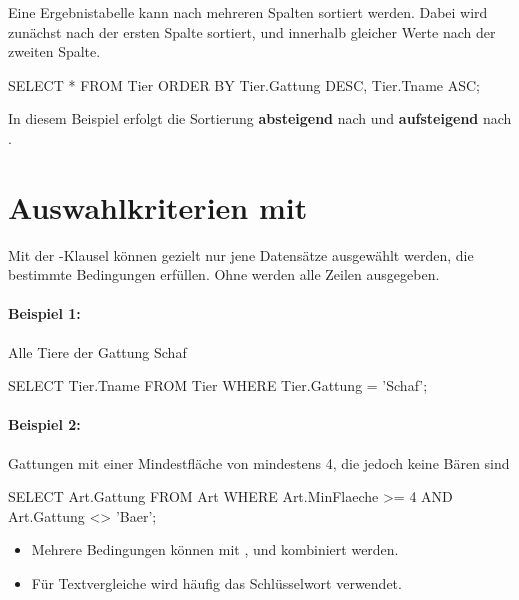     \begin{tcolorbox}[blue={Sortierung nach zwei Kriterien}]
    Eine Ergebnistabelle kann nach mehreren Spalten sortiert werden. 
    Dabei wird zunächst nach der ersten Spalte sortiert, und innerhalb gleicher Werte nach der zweiten Spalte.

    \begin{sql}
    SELECT * 
        FROM Tier
        ORDER BY Tier.Gattung DESC, Tier.Tname ASC;
    \end{sql}

    In diesem Beispiel erfolgt die Sortierung \textbf{absteigend} nach  
    und \textbf{aufsteigend} nach .
    \end{tcolorbox}

\section{Auswahlkriterien mit }

Mit der -Klausel können gezielt nur jene Datensätze ausgewählt werden, 
die bestimmte Bedingungen erfüllen. Ohne  werden alle Zeilen ausgegeben.

\paragraph{Beispiel 1:} Alle Tiere der Gattung Schaf
    \begin{sql}
    SELECT Tier.Tname
        FROM Tier
        WHERE Tier.Gattung = 'Schaf';
    \end{sql}

\paragraph{Beispiel 2:} Gattungen mit einer Mindestfläche von mindestens 4, 
die jedoch keine Bären sind
    \begin{sql}
    SELECT Art.Gattung
        FROM Art
        WHERE Art.MinFlaeche >= 4 AND Art.Gattung <> 'Baer';
    \end{sql}

    \begin{tcolorbox}[blue={Hinweis}]
        \begin{itemize}
            \item Mehrere Bedingungen können mit ,  und  kombiniert werden.
            \item Für Textvergleiche wird häufig das Schlüsselwort  verwendet.
        \end{itemize}
    \end{tcolorbox}


